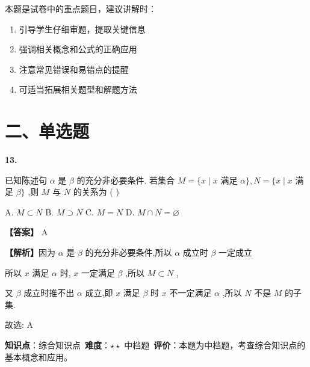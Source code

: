 \documentclass[10pt]{article}
\newenvironment{questionblock}[1]{%
  \needspace{3\baselineskip}%
  \noindent\textbf{#1.}%
}{%
  \par\vspace{1em}%
}
\begin{document}
\begin{tipbox}[教学提示]
本题是试卷中的重点题目，建议讲解时：
\begin{enumerate}
\item 引导学生仔细审题，提取关键信息
\item 强调相关概念和公式的正确应用
\item 注意常见错误和易错点的提醒
\item 可适当拓展相关题型和解题方法
\end{enumerate}
\end{tipbox}

\section*{二、单选题}

\begin{questionblock}{13}
已知陈述句 \(\alpha\) 是 \(\beta\) 的充分非必要条件. 若集合 \(M = \{ x \mid  x\) 满足 \(\alpha \} , N = \{ x \mid  x\) 满足 \(\beta \}\) ,则 \(M\) 与 \(N\) 的关系为 ( )

A. \(M \subset  N\) B. \(M \supset  N\) C. \(M = N\) D. \(M \cap  N = \varnothing\)
\end{questionblock}

\textbf{【答案】} A

\textbf{【解析】}因为 \(\alpha\) 是 \(\beta\) 的充分非必要条件,所以 \(\alpha\) 成立时 \(\beta\) 一定成立

所以 \(x\) 满足 \(\alpha\) 时, \(x\) 一定满足 \(\beta\) ,所以 \(M \subset  N\) ,

又 \(\beta\) 成立时推不出 \(\alpha\) 成立,即 \(x\) 满足 \(\beta\) 时 \(x\) 不一定满足 \(\alpha\) ,所以 \(N\) 不是 \(M\) 的子集.

故选: A

\begin{analysisbox}[考点分析]
\textbf{知识点}：综合知识点\
\textbf{难度}：$\star\star$ 中档题\
\textbf{评价}：本题为中档题，考查综合知识点的基本概念和应用。
\end{analysisbox}
\end{document}
